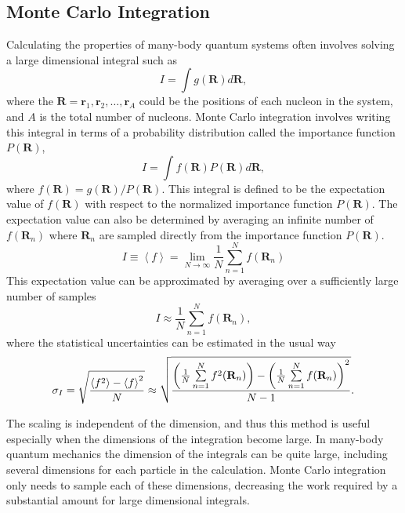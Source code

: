 \subsection{Monte Carlo Integration}
Calculating the properties of many-body quantum systems often involves solving a large dimensional integral such as
\begin{equation}
   I=\int g(\mathbf{R}) d\mathbf{R},
\end{equation}
where the $\mathbf{R}=\mathbf{r}_1,\mathbf{r}_2,\ldots,\mathbf{r}_A$ could be the positions of each nucleon in the system, and $A$ is the total number of nucleons. Monte Carlo integration involves writing this integral in terms of a probability distribution called the importance function $P(\mathbf{R})$,
\begin{equation}
   I=\int f(\mathbf{R}) P(\mathbf{R}) d\mathbf{R},
\end{equation}
where $f(\mathbf{R}) = g(\mathbf{R})/P(\mathbf{R})$. This integral is defined to be the expectation value of $f(\mathbf{R})$ with respect to the normalized importance function $P(\mathbf{R})$. The expectation value can also be determined by averaging an infinite number of $f(\mathbf{R}_n)$ where $\mathbf{R}_n$ are sampled directly from the importance function $P(\mathbf{R})$.
\begin{equation}
   I \equiv \left<f\right> = \lim\limits_{N\rightarrow\infty} \frac{1}{N} \sum\limits_{n=1}^N f(\mathbf{R}_n)
   \label{equ:mci}
\end{equation}
This expectation value can be approximated by averaging over a sufficiently large number of samples
\begin{equation}
   I \approx \frac{1}{N} \sum\limits_{n=1}^N f(\mathbf{R}_n),
\end{equation}
where the statistical uncertainties can be estimated in the usual way
\begin{equation}
   \sigma_{I} = \sqrt{\frac{\left< f^2 \right>-\left< f \right>^2}{N}} \approx \sqrt{\frac{\left(\frac{1}{N}\sum\limits_{n=1}^Nf^2(\mathbf{R}_n)\right) - \left(\frac{1}{N}\sum\limits_{n=1}^Nf(\mathbf{R}_n)\right)^2}{N-1}}.
\end{equation}

The scaling is independent of the dimension, and thus this method is useful especially when the dimensions of the integration become large. In many-body quantum mechanics the dimension of the integrals can be quite large, including several dimensions for each particle in the calculation. Monte Carlo integration only needs to sample each of these dimensions, decreasing the work required by a substantial amount for large dimensional integrals.

